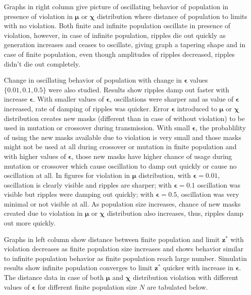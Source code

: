 Graphs in right column give picture of oscillating behavior of population in presence of violation in $\bm{\mu}$ or $\bm{\chi}$ distribution 
where distance of population to limits with no violation. Both finite and infinite population oscillate in presence of violation, however, in case of infinite population, ripples die out quickly as generation increases and ceases to oscillate, giving graph a tapering shape and in case of finite population, even though amplitudes of ripples decreased, ripples didn't die out completely. 

Change in oscillating behavior of population with change in $\bm{\epsilon}$ values $\{0.01, 0.1, 0.5\}$ were also studied. 
Results show ripples damp out faster with increase $\bm{\epsilon}$.
With smaller values of $\bm{\epsilon}$, oscillations were sharper and as value of $\bm{\epsilon}$ increased, rate of damping of ripples was quicker. 
Error $\bm{\epsilon}$ introduced to $\bm{\mu}$ or $\bm{\chi}$ distribution creates new masks (different than in case of without violation) to be used in mutation 
or crossover during transmission. With small $\bm{\epsilon}$, the probablility of using the new masks available due to violation is very small and 
those masks might not be used at all during crossover or mutation in finite population and with higher values of $\bm{\epsilon}$, 
those new masks have higher chance of usage during mutation or crossover which cause oscillation to damp out quickly or cause no oscillation at all. In figures for violation in 
$\bm{\mu}$ distribution, with $\bm{\epsilon} = 0.01$, oscillation is clearly visible and ripples are sharper; with $\bm{\epsilon} = 0.1$ oscillation was visible 
but ripples were damping out quickly;  with $\bm{\epsilon} = 0.5$, oscillation was very minimal or not visible at all. As population size increases, 
chance of new masks created due to violation in $\bm{\mu}$ or $\bm{\chi}$ distribution also increases, thus, ripples damp out more quickly.

Graphs in left column show distance between finite population and limit $\bm{z}^\ast$ with violation decreases as finite population size increases 
and shows behavior similar to infinite population behavior as finite population reach large number. Simulatin results show infinite population converges 
to limit $\bm{z^\ast}$ quicker with increase in $\bm{\epsilon}$. The distance data in case of both 
$\bm{\mu}$ and $\bm{\chi}$ distribution violation with different values of $\bm{\epsilon}$ for different finite population size $N$ are tabulated below.
\newpage

\newpage



